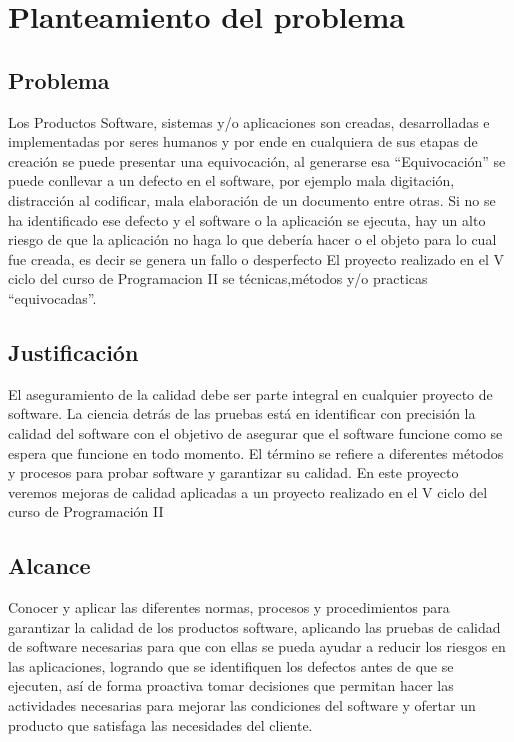 \documentclass[12pt,letterpaper]{article}
\begin{document}
\section{Planteamiento del problema}
    \subsection{Problema}
    Los Productos Software, sistemas y/o aplicaciones son creadas, desarrolladas e implementadas por seres humanos y por ende en cualquiera de sus etapas de creación se puede presentar una equivocación, al generarse esa “Equivocación” se puede conllevar a un defecto en el software, por ejemplo mala digitación, distracción al codificar, mala elaboración de un documento entre otras. Si no se ha identificado ese defecto y el software o la aplicación se ejecuta, hay un alto riesgo de que la aplicación no haga lo que debería hacer o el objeto para lo cual fue creada, es decir se genera un fallo o desperfecto
    El proyecto realizado en el V ciclo del curso de Programacion II se técnicas,métodos y/o practicas “equivocadas”.
    
    \subsection{Justificación}
    El aseguramiento de la calidad debe ser parte integral en cualquier proyecto de software. La ciencia detrás de las pruebas está en identificar con precisión la calidad del software con el objetivo de asegurar que el software funcione como se espera que funcione en todo momento. El término se refiere a diferentes métodos y procesos para probar software y garantizar su calidad.
    En este proyecto veremos mejoras de calidad aplicadas a un proyecto realizado en el V ciclo del curso de Programación II

    \subsection{Alcance}
    Conocer y aplicar las diferentes normas, procesos y procedimientos para garantizar la calidad de los productos software, aplicando las pruebas de calidad de software necesarias para que con ellas se pueda ayudar a reducir los riesgos en las aplicaciones, logrando que se identifiquen los defectos antes de que se ejecuten, así de forma proactiva tomar decisiones que permitan  hacer las actividades necesarias para mejorar las condiciones del software y ofertar un producto que satisfaga las necesidades del cliente.
\end{document}
